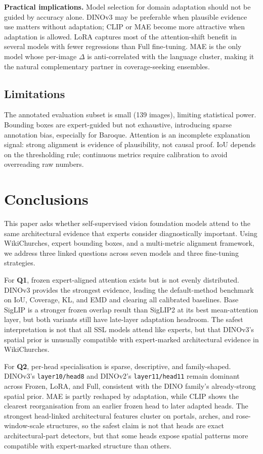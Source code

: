 \documentclass[lineno,pdflatex,sn-mathphys-num]{sn-jnl}%
\theoremstyle{thmstyleone}%
\theoremstyle{thmstyletwo}%
\theoremstyle{thmstylethree}%
\begin{document}
\textbf{Practical implications.} Model selection for domain adaptation should not be guided by accuracy alone. DINOv3 may be preferable when plausible evidence use matters without adaptation; CLIP or MAE become more attractive when adaptation is allowed. LoRA captures most of the attention-shift benefit in several models with fewer regressions than Full fine-tuning. MAE is the only model whose per-image $\Delta$ is anti-correlated with the language cluster, making it the natural complementary partner in coverage-seeking ensembles.

\subsection{Limitations}

The annotated evaluation subset is small (139 images), limiting statistical power. Bounding boxes are expert-guided but not exhaustive, introducing sparse annotation bias, especially for Baroque. Attention is an incomplete explanation signal: strong alignment is evidence of plausibility, not causal proof. IoU depends on the thresholding rule; continuous metrics require calibration to avoid overreading raw numbers.

\section{Conclusions} \label{section conclusions}

This paper asks whether self-supervised vision foundation models attend to the same architectural evidence that experts consider diagnostically important. Using WikiChurches, expert bounding boxes, and a multi-metric alignment framework, we address three linked questions across seven models and three fine-tuning strategies.

For \textbf{Q1}, frozen expert-aligned attention exists but is not evenly distributed. DINOv3 provides the strongest evidence, leading the default-method benchmark on IoU, Coverage, KL, and EMD and clearing all calibrated baselines. Base SigLIP is a stronger frozen overlap result than SigLIP2 at its best mean-attention layer, but both variants still have late-layer adaptation headroom. The safest interpretation is not that all SSL models attend like experts, but that DINOv3's spatial prior is unusually compatible with expert-marked architectural evidence in WikiChurches.

For \textbf{Q2}, per-head specialisation is sparse, descriptive, and family-shaped. DINOv3's \texttt{layer10/head8} and DINOv2's \texttt{layer11/head11} remain dominant across Frozen, LoRA, and Full, consistent with the DINO family's already-strong spatial prior. MAE is partly reshaped by adaptation, while CLIP shows the clearest reorganisation from an earlier frozen head to later adapted heads. The strongest head-linked architectural features cluster on portals, arches, and rose-window-scale structures, so the safest claim is not that heads are exact architectural-part detectors, but that some heads expose spatial patterns more compatible with expert-marked structure than others.
\end{document}
